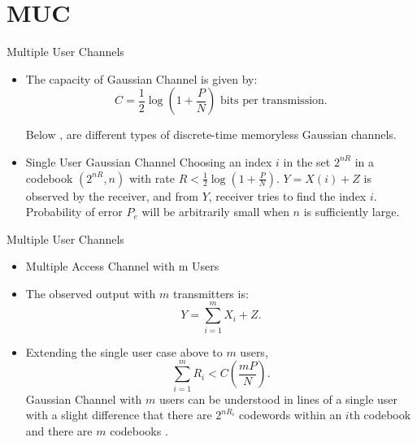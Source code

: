 \documentclass{beamer}
\begin{document}
\section{MUC}
\begin{frame}{Multiple User Channels}
 \begin{itemize}
	\justifying
\item The capacity of Gaussian Channel is given by:
\begin{equation}
C = \frac{1}{2} \log \left( 1 + \frac{P}{N} \right) \text{ bits per transmission.}
\end{equation}

Below , are different types of discrete-time memoryless Gaussian channels.
\item Single User Gaussian Channel
Choosing an index \( i \) in the set \( 2^{nR} \) in a codebook \( (2^{nR}, n) \) with rate \( R < \frac{1}{2} \log(1 + \frac{P}{N}) \). \( Y = X(i) + Z \) is observed by the receiver, and from \( Y \), receiver tries to find the index \( i \).
Probability of error \( P_e\) will be arbitrarily small when \( n \) is sufficiently large.



	\end{itemize}
\end{frame}
\begin{frame}{Multiple User Channels}
 \begin{itemize}
	\justifying
\item  Multiple Access Channel with m Users 
\item The observed output with \( m \) transmitters is:
\begin{equation}
Y = \sum_{i=1}^m X_i + Z.
\end{equation}
\item Extending the single user case above to $m$ users,
\begin{equation}
\sum_{i=1}^m R_i < C \left( \frac{mP}{N} \right).
\end{equation}
Gaussian Channel with \( m \) users can be understood in lines of a single user with a slight difference that there are \( 2^{n R_i} \) codewords within an \( i \)th codebook and there are  \( m \) codebooks .




	\end{itemize}
\end{frame}
\end{document}
